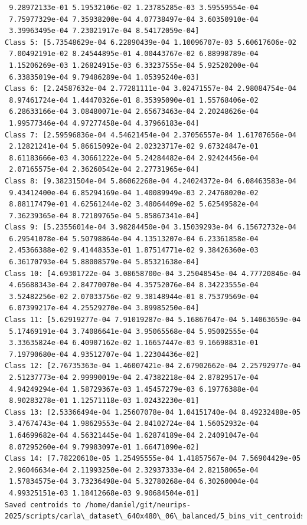 \begin{verbatim}
 9.28972133e-01 5.19532106e-02 1.23785285e-03 3.59559554e-04
 7.75977329e-04 7.35938200e-04 4.07738497e-04 3.60350910e-04
 3.39963495e-04 7.23021917e-04 8.54172059e-04]
Class 5: [5.73548629e-04 6.22890439e-04 1.10096707e-03 5.60617606e-02
 7.00492191e-02 8.24544895e-01 4.00443767e-02 6.88998789e-04
 1.15206269e-03 1.26824915e-03 6.33237555e-04 5.92520200e-04
 6.33835019e-04 9.79486289e-04 1.05395240e-03]
Class 6: [2.24587632e-04 2.77281111e-04 3.02471557e-04 2.98084754e-04
 8.97461724e-04 1.44470326e-01 8.35395090e-01 1.55768406e-02
 6.28633166e-04 3.08480071e-04 2.65673463e-04 2.20248626e-04
 1.99577346e-04 4.97277458e-04 4.37966183e-04]
Class 7: [2.59596836e-04 4.54621454e-04 2.37056557e-04 1.61707656e-04
 2.12821241e-04 5.86615092e-04 2.02323717e-02 9.67324847e-01
 8.61183666e-03 4.30661222e-04 5.24284482e-04 2.92424456e-04
 2.07165575e-04 2.36260542e-04 2.27731965e-04]
Class 8: [9.38231504e-04 5.86062268e-04 4.24024372e-04 6.08463583e-04
 9.43412400e-04 6.85294169e-04 1.40089949e-03 2.24768020e-02
 8.88117479e-01 4.62561244e-02 3.48064409e-02 5.62549582e-04
 7.36239365e-04 8.72109765e-04 5.85867341e-04]
Class 9: [5.23556014e-04 3.98284450e-04 3.15039293e-04 6.15672732e-04
 6.29541078e-04 5.50798864e-04 4.13513207e-04 6.23361858e-04
 2.45366388e-02 9.41448353e-01 1.87514771e-02 9.38426360e-03
 6.36170793e-04 5.88008579e-04 5.85321638e-04]
Class 10: [4.69301722e-04 3.08658700e-04 3.25048545e-04 4.77720846e-04
 4.65688343e-04 2.84770070e-04 4.35752076e-04 8.34223555e-04
 3.52482256e-02 2.07033756e-02 9.38148944e-01 8.75379569e-04
 6.07399217e-04 4.25529270e-04 3.89985250e-04]
Class 11: [5.62919277e-04 7.91019287e-04 5.16867647e-04 5.14063659e-04
 5.17469191e-04 3.74086641e-04 3.95065568e-04 5.95002555e-04
 3.33635824e-04 6.40907162e-02 1.16657447e-03 9.16698831e-01
 7.19790680e-04 4.93512707e-04 1.22304436e-02]
Class 12: [2.76735363e-04 1.46007421e-04 2.67902662e-04 2.25792977e-04
 2.51237773e-04 2.99990019e-04 2.47382218e-04 2.87829517e-04
 4.94249294e-04 1.58729367e-03 1.45457279e-03 6.19776388e-04
 8.90283278e-01 1.12571118e-03 1.02432230e-01]
Class 13: [2.53366494e-04 1.25607078e-04 1.04151740e-04 8.49232488e-05
 3.47674743e-04 1.98629553e-04 2.84102724e-04 1.56052932e-04
 1.64699682e-04 4.56321445e-04 1.62874189e-04 2.24091047e-04
 8.07295260e-04 9.79983097e-01 1.66471090e-02]
Class 14: [7.78220610e-05 1.25495555e-04 1.41857567e-04 7.56904429e-05
 2.96046634e-04 2.11993250e-04 2.32937333e-04 2.82158065e-04
 1.57834575e-04 3.73236498e-04 5.32780268e-04 6.30260004e-04
 4.99325151e-03 1.18412668e-03 9.90684504e-01]
Saved centroids to /home/daniel/git/neurips-2025/scripts/carla\_dataset\_640x480\_06\_balanced/5_bins_vit_centroids\_balanced.npy

\end{verbatim}
